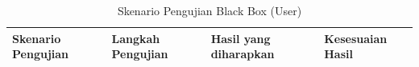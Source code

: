 \begin{longtable}{|p{3.8cm}|p{4.5cm}|p{4.5cm}|p{2cm}|}
    \caption{Skenario Pengujian Black Box (User)} \label{tabel:rancangan_bb_user}                                                                                                                                                                                                                                                                                                                                                                                                                                                                                            \\
    \hline
    \textbf{Skenario Pengujian}                                                & \textbf{Langkah Pengujian}                                                                                                                                                                                                                                                                                        & \textbf{Hasil yang diharapkan}                                                                                                              & \textbf{Kesesuaian Hasil} \\
    \hline
    \endfirsthead



\end{longtable}

